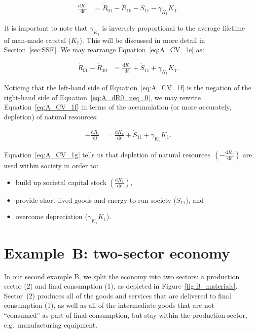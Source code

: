  \begin{align}\label{eq:A_CV_1e}
	\frac{\mathrm{d}K_{1}}{\mathrm{d}t}		&
	= \dot{R}_{01} 
	- \dot{R}_{10}
	- \dot{S}_{11}
	- \gamma_{K_{1}}{K}_{1}.
\end{align}

It is important to note that $\gamma_{K_{1}}$ 
is inversely proportional to the average lifetime
of man-made capital ($K_{1}$).
This will be discussed in more detail in
Section~\ref{sec:SSE}.
We may rearrange Equation~\ref{eq:A_CV_1e} as:

 \begin{align}\label{eq:A_CV_1f}
	\dot{R}_{01} 
	- \dot{R}_{10}												&
	= 	\frac{\mathrm{d}K_{1}}{\mathrm{d}t}
	+ \dot{S}_{11}
	+ \gamma_{K_{1}}{K}_{1}.
\end{align}

Noticing that the left-hand side
of Equation~\ref{eq:A_CV_1f} is the negation 
of the right-hand side of Equation~\ref{eq:A_dR0_neq_0},
we may rewrite Equation~\ref{eq:A_CV_1f}
in terms of the accumulation 
(or more accurately, depletion)
of natural resources: 

 \begin{align}\label{eq:A_CV_1g}
	- 	\frac{\mathrm{d}R_{0}}{\mathrm{d}t}	&
	= 	\frac{\mathrm{d}K_{1}}{\mathrm{d}t}
	+ \dot{S}_{11}
	+ \gamma_{K_{1}}{K}_{1}.
\end{align}

Equation~\ref{eq:A_CV_1g} tells us that depletion of
natural resources~$\left(-\frac{\mathrm{d}R_{0}}{\mathrm{d}t}\right)$
are used within society in order to:

\begin{itemize}
	\item build up societal capital stock 
	$\left(\frac{\mathrm{d}K_{1}}{\mathrm{d}t}\right)$,
	\item provide short-lived goods and energy to 
	run society ($\dot{S}_{11}$), and
	\item overcome depreciation
	($\gamma_{K_{1}}{K}_{1}$).
\end{itemize}




\section{Example~B: two-sector economy} %
\label{sec:B_materials}

In our second example B, we split the economy into two sectors: 
a production sector (2) and final consumption (1), 
as depicted in Figure~\ref{fig:B_materials}. 
Sector~(2) produces all of the goods and services 
that are delivered to final consumption (1), 
as well as all of the intermediate goods that are not ``consumed'' 
as part of final consumption, but stay within the production sector, e.g.\ manufacturing equipment.

